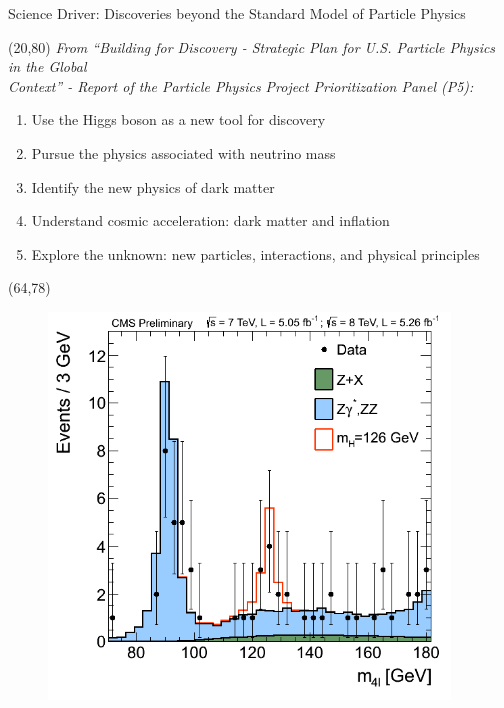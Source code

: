 \documentclass[final]{beamer}
\begin{document}
\begin{frame}{}
\begin{textblock}{80.0}
\begin{block}{Science Driver: Discoveries beyond the Standard Model of Particle Physics}
\begin{textblock}{50.0}(20,80)
{\it From ``Building for Discovery - Strategic Plan for U.S. Particle Physics in the Global \\
Context'' - Report of the Particle Physics Project Prioritization Panel (P5):}

\begin{center}
\begin{enumerate}
\item Use the Higgs boson as a new tool for discovery
\item Pursue the physics associated with neutrino mass
\item Identify the new physics of dark matter
\item Understand cosmic acceleration: dark matter and inflation
\item Explore the unknown: new particles, interactions, and physical principles
\end{enumerate}
\end{center}
\end{textblock}

\begin{textblock}{16.0}(64,78)
\begin{figure}[H]
\includegraphics[width=0.95\textwidth]{images/Fig4-ZZMass_7Plus8TeV_70-180_3GeV.png}
\end{figure}
\end{textblock}



\end{block}
\end{textblock}
\end{frame}
\end{document}

